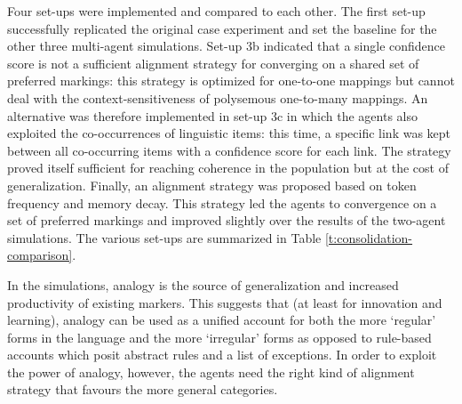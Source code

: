 Four set-ups were implemented and compared to each other. The first set-up successfully replicated the original case experiment and set the baseline for the other three multi-agent simulations. Set-up 3b indicated that a single confidence score is not a sufficient alignment strategy for converging on a shared set of preferred markings: this strategy is optimized for one-to-one mappings but cannot deal with the context-sensitiveness of polysemous one-to-many mappings. An alternative was therefore implemented in set-up 3c in which the agents also exploited the co-occurrences of linguistic items: this time, a specific link was kept between all co-occurring items with a confidence score for each link. The strategy proved itself sufficient for reaching coherence in the population but at the cost of generalization. Finally, an alignment strategy was proposed based on token frequency and memory decay. This strategy led the agents to convergence on a set of preferred markings and improved slightly over the results of the two-agent simulations. The various set-ups are summarized in Table \ref{t:consolidation-comparison}.

In the simulations, analogy is the source of generalization and increased productivity of existing markers. This suggests that (at least for innovation and learning), analogy can be used as a unified account for both the more `regular' forms in the language and the more `irregular' forms as opposed to rule-based accounts which posit abstract rules and a list of exceptions. In order to exploit the power of analogy, however, the agents need the right kind of alignment strategy that favours the more general categories.

